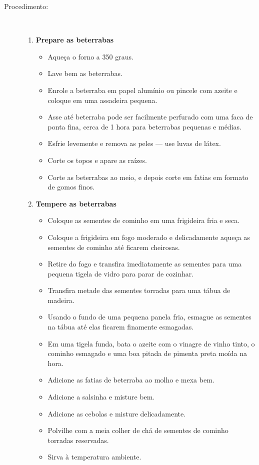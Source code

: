 \documentclass [11pt, papel de carta] {article}
\begin{document}
\begin {description}
\item [Procedimento:] \ \\
\begin {enumerate}
\item {\bf Prepare as beterrabas}
\begin {itemize}
\item Aqueça o forno a 350 graus.
\item Lave bem as beterrabas.
\item Enrole a beterraba em papel alumínio ou pincele com azeite e coloque em uma assadeira pequena.
\item Asse até beterraba pode ser facilmente perfurado com uma faca de ponta fina, cerca de 1 hora para beterrabas pequenas e médias.
\item Esfrie levemente e remova as peles --- use luvas de látex.
\item Corte os topos e apare as raízes.
\item Corte as beterrabas ao meio, e depois corte em fatias em formato de gomos finos.
\end {itemize}
\item {\bf Tempere as beterrabas}
\begin {itemize}
\item Coloque as sementes de cominho em uma frigideira fria e seca.
\item Coloque a frigideira em fogo moderado e delicadamente aqueça as sementes de cominho até ficarem cheirosas.
\item Retire do fogo e transfira imediatamente as sementes para uma pequena tigela de vidro para parar de cozinhar.
\item Transfira metade das sementes torradas para uma tábua de madeira.
\item Usando o fundo de uma pequena panela fria, esmague as sementes na tábua até elas ficarem finamente esmagadas.
\item Em uma tigela funda, bata o azeite com o vinagre de vinho tinto, o cominho esmagado e uma boa pitada de pimenta preta moída na hora.
\item Adicione as fatias de beterraba ao molho e mexa bem.
\item Adicione a salsinha e misture bem.
\item Adicione as cebolas e misture delicadamente.
\item Polvilhe com a meia colher de chá de sementes de cominho torradas reservadas.
\item Sirva à temperatura ambiente.
\end {itemize}
\end {enumerate}
\end {description}
\end{document}
